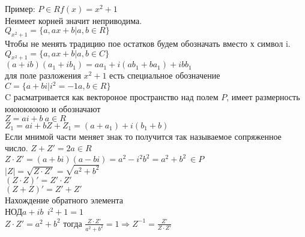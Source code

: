 Пример: $P\in R f(x) = x^2 + 1$\\
Неимеет корней значит неприводима.\\
$Q_{x^2+1} = \{a, ax + b | a,b\in R\}$\\
Чтобы не менять традицию пое остатков будем обозначать
вместо х символ i.\\
$Q_{x^2+1} = \{a, ax + b | a,b\in C\}$\\
$(a + ib)(a_1 + ib_1) =
a{a_1} + i(a{b_1} + b{a_1}) + ib{b_1}$\\
для поле разложения $x^2 + 1$ есть специальное обозначение
$C = \{a + bi | i^2 = -1 a,b\in R\}$\\
C расматривается как вектороное пространство над полем $P$,
имеет размерность ююююююю и обозначают\\
$Z = ai + b ~ a\in R$\\
$Z_1 = ai + b Z + Z_1 = (a + a_1) + i(b_1 + b)$\\
Если мнимой части меняет знак то получится так называемое
сопряженное число.
$Z + Z' = 2a\in R$\\
$Z \cdot Z' = (a + bi)(a - bi) = a^2 - {i^2}{b^2} =
a^2 + b^2 ~ \in P$\\
$|Z| = \sqrt{Z\cdot Z'} = \sqrt{a^2 + b^2}$\\
$(Z\cdot Z)' = Z' \cdot Z'$\\
$(Z + Z)' = Z' + Z'$\\

Нахождение обратного элемента\\
НОД$a+ib ~~ i^2 + 1 = 1$\\

$Z \cdot Z' = a^2 + b^2$ тогда
$\frac{Z \cdot Z'}{a^2 + b^2} = 1 \Rightarrow
Z^{-1} = \frac{Z'}{Z\cdot Z'}$\\

